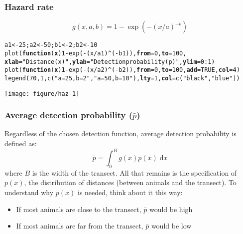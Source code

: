 \documentclass[color=usenames,dvipsnames]{beamer}\usepackage[]{graphicx}\usepackage[]{color}
\makeatletter
\newcommand{\hlnum}[1]{\textcolor[rgb]{0.69,0.494,0}{#1}}%
\newcommand{\hlstr}[1]{\textcolor[rgb]{0.749,0.012,0.012}{#1}}%
\newcommand{\hlopt}[1]{\textcolor[rgb]{0,0,0}{#1}}%
\newcommand{\hlstd}[1]{\textcolor[rgb]{0,0,0}{#1}}%
\newcommand{\hlkwa}[1]{\textcolor[rgb]{0,0,0}{\textbf{#1}}}%
\newcommand{\hlkwb}[1]{\textcolor[rgb]{0,0.341,0.682}{#1}}%
\newcommand{\hlkwc}[1]{\textcolor[rgb]{0,0,0}{\textbf{#1}}}%
\newcommand{\hlkwd}[1]{\textcolor[rgb]{0.004,0.004,0.506}{#1}}%
\newenvironment{kframe}{%
 \def\at@end@of@kframe{}%
 \ifinner\ifhmode%
  \def\at@end@of@kframe{\end{minipage}}%
  \begin{minipage}{\columnwidth}%
 \fi\fi%
 \def\FrameCommand##1{\hskip\@totalleftmargin \hskip-\fboxsep
 \colorbox{shadecolor}{##1}\hskip-\fboxsep
     \hskip-\linewidth \hskip-\@totalleftmargin \hskip\columnwidth}%
 \MakeFramed {\advance\hsize-\width
   \@totalleftmargin\z@ \linewidth\hsize
   \@setminipage}}%
 {\par\unskip\endMakeFramed%
 \at@end@of@kframe}
\newenvironment{knitrout}{}{} %
\makeatother
\begin{document}
\begin{frame}[fragile]
  \frametitle{Hazard rate}
  \footnotesize
  \[
    g(x,a,b) = 1-\exp(-(x/a)^{-b})
  \]
  \vspace{-12pt}
  \centering
\begin{knitrout}\scriptsize
{}\color{fgcolor}\begin{kframe}
\begin{alltt}
\hlstd{a1} \hlkwb{<-} \hlnum{25}\hlstd{; a2} \hlkwb{<-} \hlnum{50}\hlstd{; b1} \hlkwb{<-} \hlnum{2}\hlstd{; b2} \hlkwb{<-} \hlnum{10}
\hlkwd{plot}\hlstd{(}\hlkwa{function}\hlstd{(}\hlkwc{x}\hlstd{)} \hlnum{1}\hlopt{-}\hlkwd{exp}\hlstd{(}\hlopt{-}\hlstd{(x}\hlopt{/}\hlstd{a1)}\hlopt{^}\hlstd{(}\hlopt{-}\hlstd{b1)),} \hlkwc{from}\hlstd{=}\hlnum{0}\hlstd{,} \hlkwc{to}\hlstd{=}\hlnum{100}\hlstd{,}
     \hlkwc{xlab}\hlstd{=}\hlstr{"Distance (x)"}\hlstd{,} \hlkwc{ylab}\hlstd{=}\hlstr{"Detection probability (p)"}\hlstd{,} \hlkwc{ylim}\hlstd{=}\hlnum{0}\hlopt{:}\hlnum{1}\hlstd{)}
\hlkwd{plot}\hlstd{(}\hlkwa{function}\hlstd{(}\hlkwc{x}\hlstd{)} \hlnum{1}\hlopt{-}\hlkwd{exp}\hlstd{(}\hlopt{-}\hlstd{(x}\hlopt{/}\hlstd{a2)}\hlopt{^}\hlstd{(}\hlopt{-}\hlstd{b2)),} \hlkwc{from}\hlstd{=}\hlnum{0}\hlstd{,} \hlkwc{to}\hlstd{=}\hlnum{100}\hlstd{,} \hlkwc{add}\hlstd{=}\hlnum{TRUE}\hlstd{,} \hlkwc{col}\hlstd{=}\hlnum{4}\hlstd{)}
\hlkwd{legend}\hlstd{(}\hlnum{70}\hlstd{,} \hlnum{1}\hlstd{,} \hlkwd{c}\hlstd{(}\hlstr{"a=25, b=2"}\hlstd{,} \hlstr{"a=50, b=10"}\hlstd{),} \hlkwc{lty}\hlstd{=}\hlnum{1}\hlstd{,} \hlkwc{col}\hlstd{=}\hlkwd{c}\hlstd{(}\hlstr{"black"}\hlstd{,}\hlstr{"blue"}\hlstd{))}
\end{alltt}
\end{kframe}
\texttt{[image: figure/haz-1]} 

\end{knitrout}
\end{frame}



\begin{frame}
  \frametitle{Average detection probability ($\bar{p}$)}
  Regardless of the chosen detection function, average detection
  probability is defined as: 
  \[
     \bar{p} = \int_{0}^{B} g(x)p(x) \; \mathrm{d}x
   \]
   where $B$ is the width of the transect.
  \pause
  \vfill
  All that remains is the specification of $p(x)$, the
  distribution of distances (between animals and the transect).
  \pause
  \vfill
  To understand why $p(x)$ is needed, think about it this way:
  \begin{itemize}
    \item If most animals are close to the transect, $\bar{p}$ would
      be high
    \item If most animals are far from the transect, $\bar{p}$ would
      be low
  \end{itemize}
\end{frame}
\end{document}
